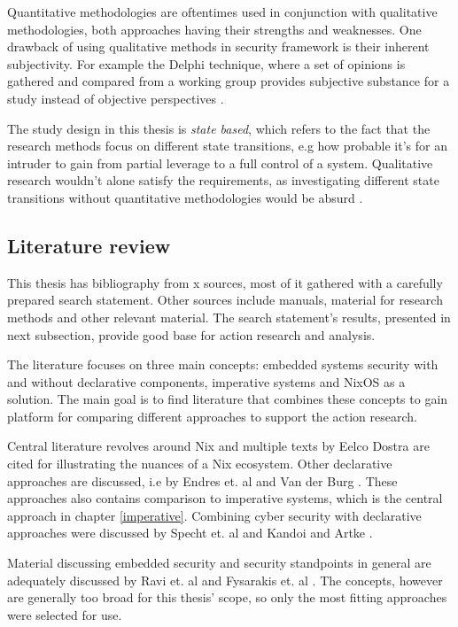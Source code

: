 Quantitative methodologies are oftentimes used in conjunction with
qualitative methodologies, both approaches having their strengths and
weaknesses. One drawback of using qualitative methods in security
framework is their inherent subjectivity. For example the Delphi
technique, where a set of opinions is gathered and compared from a
working group provides subjective substance for a study instead of
objective perspectives \cite{wang2005information}.

The study design in this thesis is \textit{state based}, which refers
to the fact that the research methods focus on different state
transitions, e.g how probable it's for an intruder to gain from
partial leverage to a full control of a system. Qualitative research
wouldn't alone satisfy the requirements, as investigating different
state transitions without quantitative methodologies would be absurd
\cite{ramos2017model}.

\subsection{Literature review}\label{litrev}

This thesis has bibliography from x sources, most of it gathered with
a carefully prepared search statement. Other sources include manuals,
material for research methods and other relevant material. The search
statement's results, presented in next subsection, provide good base
for action research and analysis.

The literature focuses on three main concepts: embedded systems
security with and without declarative components, imperative systems
and NixOS as a solution. The main goal is to find literature that
combines these concepts to gain platform for comparing different
approaches to support the action research.

Central literature revolves around Nix and multiple texts by Eelco
Dostra are cited for illustrating the nuances of a Nix
ecosystem. Other declarative approaches are discussed, i.e by Endres
et. al and Van der Burg \cite{van2010declarative,
  endres2017declarative}. These approaches also contains comparison to
imperative systems, which is the central approach in chapter
\ref{imperative}. Combining cyber security with declarative approaches
were discussed by Specht et. al and Kandoi and Artke
\cite{specht2007analysis, kandoi2021operating}.

Material discussing embedded security and security standpoints in
general are adequately discussed by Ravi et. al and Fysarakis et. al
\cite{ravi2004security, fysarakis2014embedded}. The concepts, however
are generally too broad for this thesis' scope, so only the most
fitting approaches were selected for use.

